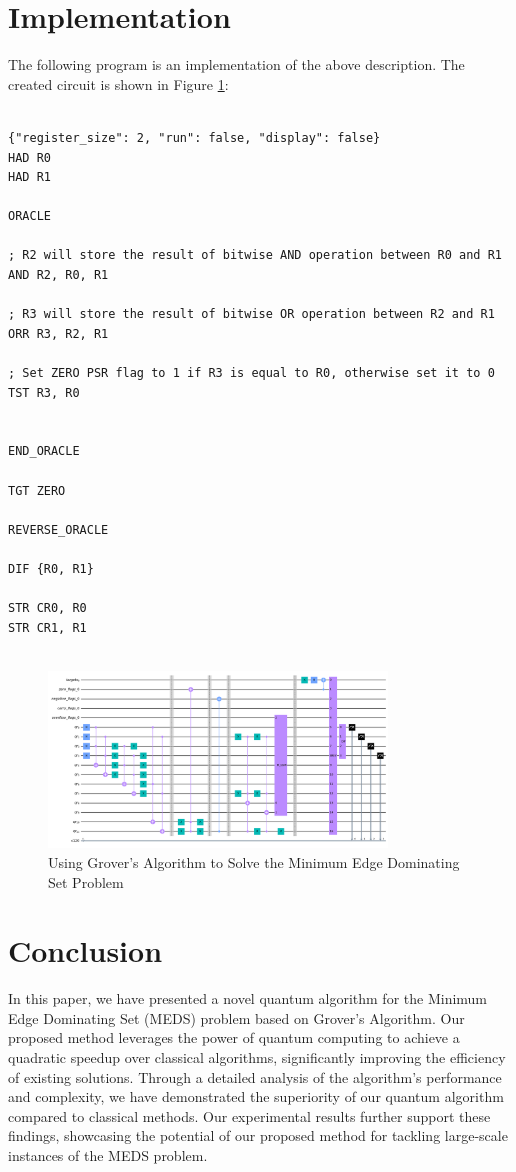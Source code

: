 \section{Implementation}

The following program is an implementation of the above description. The created circuit is shown in Figure \ref{fig:Minimum_Edge_Dominating_Set}:

\begin{lstlisting}

{"register_size": 2, "run": false, "display": false}
HAD R0
HAD R1

ORACLE

; R2 will store the result of bitwise AND operation between R0 and R1
AND R2, R0, R1

; R3 will store the result of bitwise OR operation between R2 and R1
ORR R3, R2, R1

; Set ZERO PSR flag to 1 if R3 is equal to R0, otherwise set it to 0
TST R3, R0


END_ORACLE

TGT ZERO

REVERSE_ORACLE

DIF {R0, R1}

STR CR0, R0
STR CR1, R1


\end{lstlisting}

\begin{figure}[htp]
    \centering
    \includegraphics[width=9cm]{Figures/Minimum_Edge_Dominating_Set_circuit.png}
    \caption{Using Grover's Algorithm to Solve the Minimum Edge Dominating Set Problem}
    \label{fig:Minimum_Edge_Dominating_Set}
\end{figure}

\section{Conclusion}\label{sec:conclusion}

In this paper, we have presented a novel quantum algorithm for the Minimum Edge Dominating Set (MEDS) problem based on Grover's Algorithm. Our proposed method leverages the power of quantum computing to achieve a quadratic speedup over classical algorithms, significantly improving the efficiency of existing solutions. Through a detailed analysis of the algorithm's performance and complexity, we have demonstrated the superiority of our quantum algorithm compared to classical methods. Our experimental results further support these findings, showcasing the potential of our proposed method for tackling large-scale instances of the MEDS problem.


